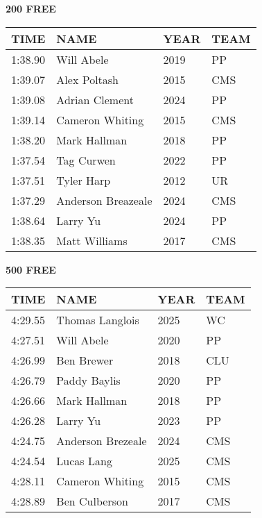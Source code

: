 \begin{minipage}[t]{0.48\textwidth}
\centering
\textbf{200 FREE}\\[0.05cm]
\begin{tabular}{@{}p{1.8cm}p{2.8cm}p{1.2cm}p{1.4cm}@{}}
\hline
\textbf{TIME} & \textbf{NAME} & \textbf{YEAR} & \textbf{TEAM} \\
\hline
1:38.90 & Will Abele & 2019 & PP \\
1:39.07 & Alex Poltash & 2015 & CMS \\
1:39.08 & Adrian Clement & 2024 & PP \\
1:39.14 & Cameron Whiting & 2015 & CMS \\
1:38.20 & Mark Hallman & 2018 & PP \\
1:37.54 & Tag Curwen & 2022 & PP \\
1:37.51 & Tyler Harp & 2012 & UR \\
1:37.29 & Anderson Breazeale & 2024 & CMS \\
1:38.64 & Larry Yu & 2024 & PP \\
1:38.35 & Matt Williams & 2017 & CMS \\
\hline
\end{tabular}
\end{minipage}\hfill
\begin{minipage}[t]{0.48\textwidth}
\centering
\textbf{500 FREE}\\[0.05cm]
\begin{tabular}{@{}p{1.8cm}p{2.8cm}p{1.2cm}p{1.4cm}@{}}
\hline
\textbf{TIME} & \textbf{NAME} & \textbf{YEAR} & \textbf{TEAM} \\
\hline
4:29.55 & Thomas Langlois & 2025 & WC \\
4:27.51 & Will Abele & 2020 & PP \\
4:26.99 & Ben Brewer & 2018 & CLU \\
4:26.79 & Paddy Baylis & 2020 & PP \\
4:26.66 & Mark Hallman & 2018 & PP \\
4:26.28 & Larry Yu & 2023 & PP \\
4:24.75 & Anderson Brezeale & 2024 & CMS \\
4:24.54 & Lucas Lang & 2025 & CMS \\
4:28.11 & Cameron Whiting & 2015 & CMS \\
4:28.89 & Ben Culberson & 2017 & CMS \\
\hline
\end{tabular}
\end{minipage}

\vspace{0.4cm}

